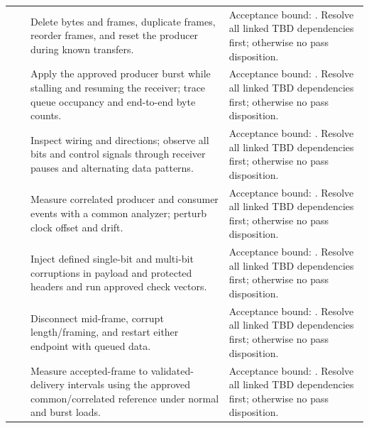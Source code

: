 \begin{landscape}
\begin{tabularx}{\linewidth}{L{2cm}L{3cm}Y Y}
 & \par {} & Delete bytes and frames, duplicate frames, reorder frames, and reset the producer during known transfers. & Acceptance bound: . Resolve all linked TBD dependencies first; otherwise no pass disposition.\\
 & \par {} & Apply the approved producer burst while stalling and resuming the receiver; trace queue occupancy and end-to-end byte counts. & Acceptance bound: . Resolve all linked TBD dependencies first; otherwise no pass disposition.\\
 & \par {} & Inspect wiring and directions; observe all bits and control signals through receiver pauses and alternating data patterns. & Acceptance bound: . Resolve all linked TBD dependencies first; otherwise no pass disposition.\\
 & \par {} & Measure correlated producer and consumer events with a common analyzer; perturb clock offset and drift. & Acceptance bound: . Resolve all linked TBD dependencies first; otherwise no pass disposition.\\
 & \par {} & Inject defined single-bit and multi-bit corruptions in payload and protected headers and run approved check vectors. & Acceptance bound: . Resolve all linked TBD dependencies first; otherwise no pass disposition.\\
 & \par {} & Disconnect mid-frame, corrupt length/framing, and restart either endpoint with queued data. & Acceptance bound: . Resolve all linked TBD dependencies first; otherwise no pass disposition.\\
 & \par {} & Measure accepted-frame to validated-delivery intervals using the approved common/correlated reference under normal and burst loads. & Acceptance bound: . Resolve all linked TBD dependencies first; otherwise no pass disposition.\\
\end{tabularx}
\normalsize
\end{landscape}
